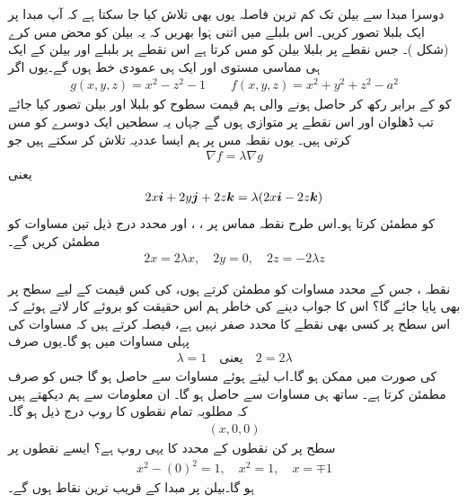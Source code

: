 دوسرا 
مبدا سے بیلن تک کم ترین فاصلہ یوں بھی تلاش کیا جا سکتا ہے کہ آپ مبدا پر ایک بلبلا  تصور کریں۔ اس بلبلے میں اتنی ہَوا بھریں  کہ یہ بیلن کو   محض مس کرے (شکل )۔ جس نقطے  پر  بلبلا بیلن کو مس کرتا  ہے اس نقطے  پر  بلبلے اور بیلن کے ایک ہی مماسی مستوی  اور ایک ہی عمودی خط ہوں گے۔یوں اگر
\begin{align*}
g(x,y,z)=x^2-z^2-1\quad \text{}\quad f(x,y,z)=x^2+y^2+z^2-a^2
\end{align*}
کو  کے برابر رکھ کر   حاصل ہونے والی  ہم قیمت سطوح  کو   بلبلا اور بیلن تصور کیا جائے  تب ڈھلوان  اور   اس نقطے  پر متوازی ہوں گے جہاں یہ سطحیں ایک دوسرے کو مس کرتی ہیں۔ یوں  نقطہ مس  پر ہم ایسا عددیہ   تلاش کر سکتے ہیں جو
\begin{align*}
\nabla f=\lambda \nabla g
\end{align*}
یعنی
\begin{align*}
2x{\boldsymbol{i}}+2y{\boldsymbol{j}}+2z{\boldsymbol{k}}=\lambda(2x{\boldsymbol{i}}-2z{\boldsymbol{k}})
\end{align*}
کو مطمئن کرتا ہو۔اس طرح نقطہ مماس پر ، ،  اور  محدد درج ذیل تین مساوات کو مطمئن کریں گے۔
\begin{align}\label{مساوات_کثیرالمتغیر_مماسی_نقطہ_شرط}
2x=2\lambda x,\quad 2y=0,\quad 2z=-2\lambda z
\end{align}

نقطہ ،  جس کے محدد  مساوات  کو مطمئن کرتے  ہوں،      کی کس قیمت کے لیے سطح  پر بھی  پایا جائے گا؟   اس کا جواب  دینے   کی خاطر ہم اس حقیقت کو  بروئے کار لاتے ہوئے  کہ  اس سطح پر کسی بھی نقطے کا  محدد صفر نہیں ہے، فیصلہ کرتے ہیں   کہ مساوات  کی پہلی مساوات میں  ہو گا۔یوں   صرف
\begin{align*}
\lambda=1\quad \text{یعنی}\quad 2=2\lambda
\end{align*}
کی صورت  میں ممکن ہو گا۔اب  لیتے ہوئے مساوات  سے  حاصل ہو گا جس کو صرف  مطمئن کرتا ہے۔ ساتھ ہی  مساوات   سے  حاصل ہو گا۔ ان معلومات سے ہم دیکھتے ہیں کہ مطلوبہ تمام  نقطوں کا روپ درج ذیل ہو گا۔
\begin{align*}
(x,0,0)
\end{align*}
سطح  پر کن  نقطوں  کے محدد کا یہی  روپ ہے؟ ایسے  نقطوں پر
\begin{align*}
x^2-(0)^2=1,\quad x^2=1,\quad x=\mp 1
\end{align*}
ہو گا۔بیلن پر مبدا کے   قریب ترین نقاط  ہوں  گے۔ 

